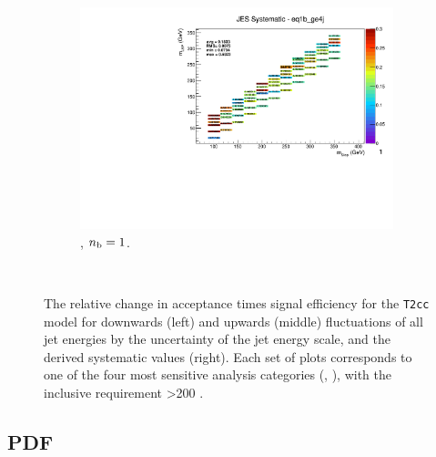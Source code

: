 \begin{figure}[ht!]
\begin{subfigure}[b]{0.32\textwidth}
    \includegraphics[width=\textwidth, page=1]{Figs/sms/t2cc/v37/systs_v2/T2cc_JES_eq1b_ge4j.pdf}
    \caption{\njhigh, $n_{\text{b}} = 1$.}
    \label{fig:sms-jes-t2cc-ge4j-1b}
  \end{subfigure}\\
  \caption{The relative change in acceptance times signal efficiency for the
  \texttt{T2cc} model for downwards (left) and upwards (middle) fluctuations
  of all jet energies by the uncertainty of the jet energy scale, and the 
  derived systematic values (right). Each set of plots corresponds to one of
  the four most sensitive analysis categories (\nb, \nj), with the inclusive 
  requirement \HT>200 \gev.}
  \label{fig:sms-jes-t2cc}
\end{figure}


\newpage
\subsection*{PDF}
\label{sec:t2cc_pdf_plots}

